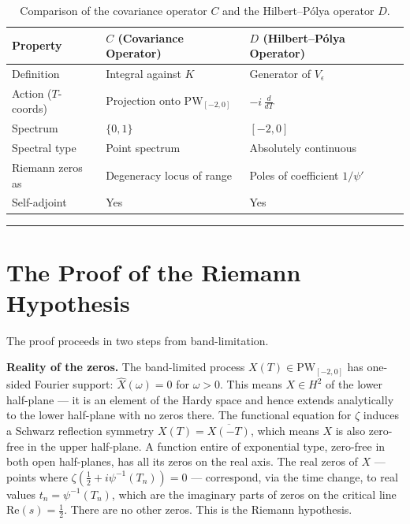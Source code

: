 \documentclass[12pt]{article}
\begin{document}
\begin{table}[h]
\centering
\caption{Comparison of the covariance operator $C$ and the Hilbert--P\'{o}lya operator $D$.}
\label{tab:CD}
\begin{tabular}{lll}
\toprule
\textbf{Property} & $C$ \textbf{(Covariance Operator)} & $D$ \textbf{(Hilbert--P\'{o}lya Operator)} \\
\midrule
Definition           & Integral against $K$                        & Generator of $V_\epsilon$               \\
Action ($T$-coords)  & Projection onto $\mathrm{PW}_{[-2,0]}$      & $-i\,\tfrac{d}{dT}$                     \\
Spectrum             & $\{0, 1\}$                                  & $[-2, 0]$                               \\
Spectral type        & Point spectrum                              & Absolutely continuous                   \\
Riemann zeros as     & Degeneracy locus of range                   & Poles of coefficient $1/\psi'$          \\
Self-adjoint         & Yes                                         & Yes                                     \\
\bottomrule
\end{tabular}
\end{table}

\bigskip
\hrule
\bigskip

\section{The Proof of the Riemann Hypothesis}

The proof proceeds in two steps from band-limitation.

\textbf{Reality of the zeros.} The band-limited process
$X(T) \in \mathrm{PW}_{[-2,0]}$ has one-sided Fourier support:
$\hat{X}(\omega) = 0$ for $\omega > 0$. This means $X \in H^2$ of the lower half-plane
--- it is an element of the Hardy space and hence extends analytically to the lower
half-plane with no zeros there. The functional equation for $\zeta$ induces a Schwarz
reflection symmetry $X(T) = \overline{X(-T)}$, which means $X$ is also zero-free in
the upper half-plane. A function entire of exponential type, zero-free in both open
half-planes, has all its zeros on the real axis. The real zeros of $X$ --- points where
$\zeta(\tfrac{1}{2}+i\psi^{-1}(T_n)) = 0$ --- correspond, via the time change, to real
values $t_n = \psi^{-1}(T_n)$, which are the imaginary parts of zeros on the critical
line $\mathrm{Re}(s) = \tfrac{1}{2}$. There are no other zeros. This is the Riemann
hypothesis.
\end{document}
